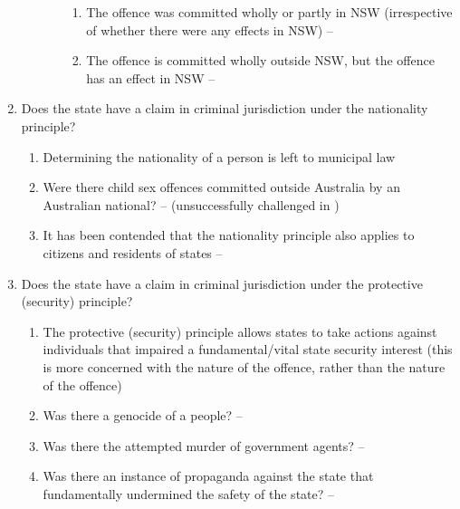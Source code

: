 \begin{enumerate}
\begin{enumerate}
\begin{enumerate}
            \begin{enumerate}
                \item The offence was committed wholly or partly in NSW (irrespective of whether there were any effects in NSW) -- 
                \item The offence is committed wholly outside NSW, but the offence has an effect in NSW -- 
            \end{enumerate}
        \end{enumerate}
    \end{enumerate}
    \item Does the state have a claim in criminal jurisdiction under the nationality principle?
    \begin{enumerate}
        \item Determining the nationality of a person is left to municipal law
        \item Were there child sex offences committed outside Australia by an Australian national? --  (unsuccessfully challenged in )
        \item It has been contended that the nationality principle also applies to citizens and residents of states -- 
    \end{enumerate}
    \item Does the state have a claim in criminal jurisdiction under the protective (security) principle?
    \begin{enumerate}
        \item The protective (security) principle allows states to take actions against individuals that impaired a fundamental/vital state security interest (this is more concerned with the nature of the offence, rather than the nature of the offence)
        \item Was there a genocide of a people? -- 
        \item Was there the attempted murder of government agents? -- 
        \item Was there an instance of propaganda against the state that fundamentally undermined the safety of the state? -- 
        \begin{enumerate}

\end{enumerate}
\end{enumerate}
\end{enumerate}

